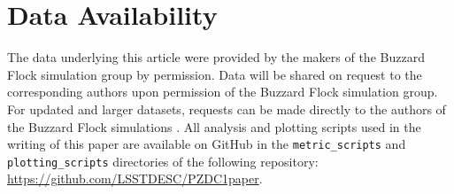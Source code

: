 \documentclass[\docopts]{\docclass}
\begin{document}



\section*{Data Availability}
The data underlying this article were provided by the makers of the Buzzard Flock simulation group by permission.  Data will be shared on request to the corresponding authors upon permission of the Buzzard Flock simulation group.  For updated and larger datasets, requests can be made directly to the authors of the Buzzard Flock simulations \citep{DeRose:19}.  All analysis and plotting scripts used in the writing of this paper are available on GitHub in the \texttt{metric\_scripts} and \texttt{plotting\_scripts} directories of the following repository: \url{https://github.com/LSSTDESC/PZDC1paper}.


\end{document}
